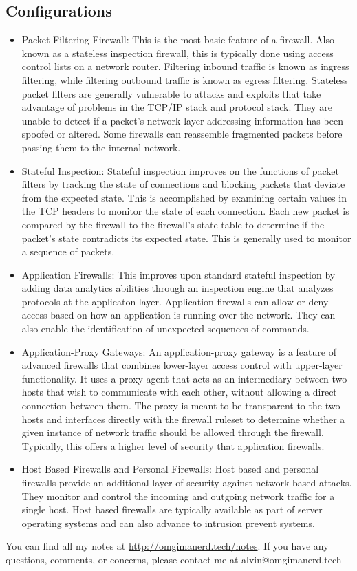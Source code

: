 \documentclass{math}
\begin{document}
\subsection*{Configurations}
\begin{itemize}
  \item Packet Filtering Firewall: This is the most basic feature of a firewall.
    Also known as a stateless inspection firewall, this is typically done using
    access control lists on a network router. Filtering inbound traffic is known
    as ingress filtering, while filtering outbound traffic is known as egress
    filtering. Stateless packet filters are generally vulnerable to attacks and
    exploits that take advantage of problems in the TCP/IP stack and protocol
    stack. They are unable to detect if a packet's network layer addressing
    information has been spoofed or altered. Some firewalls can reassemble
    fragmented packets before passing them to the internal network.
  \item Stateful Inspection: Stateful inspection improves on the functions of
    packet filters by tracking the state of connections and blocking packets
    that deviate from the expected state. This is accomplished by examining
    certain values in the TCP headers to monitor the state of each connection.
    Each new packet is compared by the firewall to the firewall's state table
    to determine if the packet's state contradicts its expected state. This is
    generally used to monitor a sequence of packets.
  \item Application Firewalls: This improves upon standard stateful inspection
    by adding data analytics abilities through an inspection engine that
    analyzes protocols at the applicaton layer. Application firewalls can allow
    or deny access based on how an application is running over the network.
    They can also enable the identification of unexpected sequences of commands.
  \item Application-Proxy Gateways: An application-proxy gateway is a feature
    of advanced firewalls that combines lower-layer access control with
    upper-layer functionality. It uses a proxy agent that acts as an
    intermediary between two hosts that wish to communicate with each other,
    without allowing a direct connection between them. The proxy is meant to be
    transparent to the two hosts and interfaces directly with the firewall
    ruleset to determine whether a given instance of network traffic should be
    allowed through the firewall. Typically, this offers a higher level of
    security that application firewalls.
  \item Host Based Firewalls and Personal Firewalls: Host based and personal
    firewalls provide an additional layer of security against network-based
    attacks. They monitor and control the incoming and outgoing network traffic
    for a single host. Host based firewalls are typically available as part of
    server operating systems and can also advance to intrusion prevent systems.
\end{itemize}

\begin{center}
  You can find all my notes at \url{http://omgimanerd.tech/notes}. If you have
  any questions, comments, or concerns, please contact me at
  alvin@omgimanerd.tech
\end{center}
\end{document}

